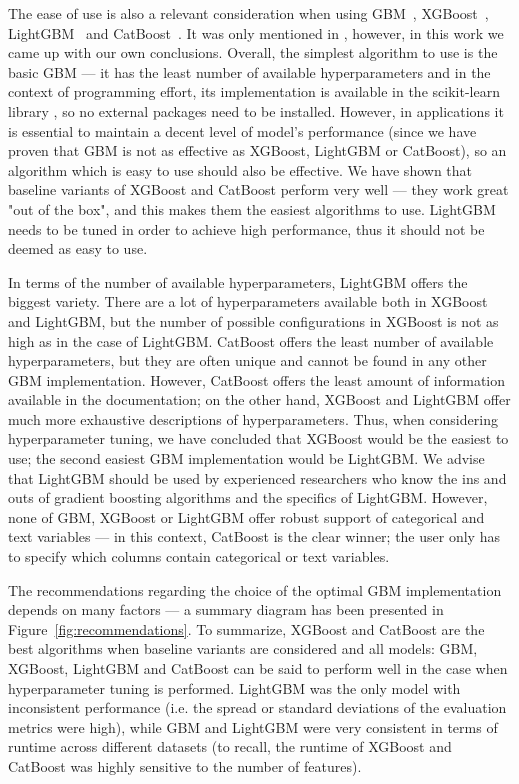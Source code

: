 \documentclass[magisterska, english]{pwr_wmat_praca_dyplomowa}
\theoremstyle{plain}
\numberwithin{theorem}{chapter}
\theoremstyle{definition}
\numberwithin{theorem}{chapter}
\begin{document}
The ease of use is also a relevant consideration when using GBM~\cite{friedman_gbm}, XGBoost~\cite{xgboost}, LightGBM~\cite{lightgbm} and CatBoost~\cite{catboost}. It was only mentioned in \cite{comparison_of}, however, in this work we came up with our own conclusions. Overall, the simplest algorithm to use is the basic GBM --- it has the least number of available hyperparameters and in the context of programming effort, its implementation is available in the scikit-learn library \cite{sklearn}, so no external packages need to be installed. However, in applications it is essential to maintain a decent level of model's performance (since we have proven that GBM is not as effective as XGBoost, LightGBM or CatBoost), so an algorithm which is easy to use should also be effective. We have shown that baseline variants of XGBoost and CatBoost perform very well --- they work great "out of the box", and this makes them the easiest algorithms to use. LightGBM needs to be tuned in order to achieve high performance, thus it should not be deemed as easy to use.

In terms of the number of available hyperparameters, LightGBM offers the biggest variety. There are a lot of hyperparameters available both in XGBoost and LightGBM, but the number of possible configurations in XGBoost is not as high as in the case of LightGBM. CatBoost offers the least number of available hyperparameters, but they are often unique and cannot be found in any other GBM implementation. However, CatBoost offers the least amount of information available in the documentation; on the other hand, XGBoost and LightGBM offer much more exhaustive descriptions of hyperparameters. Thus, when considering hyperparameter tuning, we have concluded that XGBoost would be the easiest to use; the second easiest GBM implementation would be LightGBM. We advise that LightGBM should be used by experienced researchers who know the ins and outs of gradient boosting algorithms and the specifics of LightGBM. However, none of GBM, XGBoost or LightGBM offer robust support of categorical and text variables --- in this context, CatBoost is the clear winner; the user only has to specify which columns contain categorical or text variables.

The recommendations regarding the choice of the optimal GBM implementation depends on many factors --- a summary diagram has been presented in Figure~\ref{fig:recommendations}. To summarize, XGBoost and CatBoost are the best algorithms when baseline variants are considered and all models: GBM, XGBoost, LightGBM and CatBoost can be said to perform well in the case when hyperparameter tuning is performed. LightGBM was the only model with inconsistent performance (i.e. the spread or standard deviations of the evaluation metrics were high), while GBM and LightGBM were very consistent in terms of runtime across different datasets (to recall, the runtime of XGBoost and CatBoost was highly sensitive to the number of features).
\end{document}
